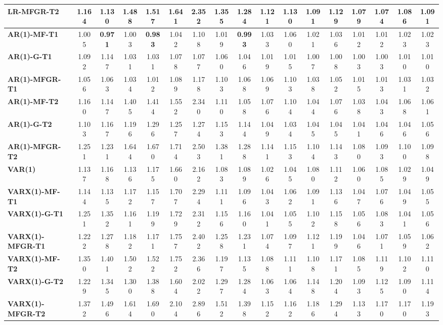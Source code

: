 \documentclass[Theme1]{{template_material/eurostat}}
\begin{document}
\begin{landscape}
\begin{table}[ht]
{\begin{tabular}{l|cc|cc|cc|cc|cc|cc|cc|cc}
\textbf{LR-MFGR-T2} & 1.164 & 1.130 & 1.488 & 1.517 & 1.641 & 2.352 & 1.355 & 1.284 & 1.121 & 1.130 & 1.091 & 1.129 & 1.079 & 1.074 & 1.086 & 1.091 \\
\hline
\textbf{AR(1)-MF-T1} & 1.005 & \textbf{0.971} & 1.003 & \textbf{0.983} & 1.042 & 1.108 & 1.019 & \textbf{0.993} & 1.033 & 1.060 & 1.021 & 1.036 & 1.012 & 1.012 & 1.023 & 1.023 \\
\textbf{AR(1)-G-T1} & 1.092 & 1.147 & 1.031 & 1.031 & 1.078 & 1.077 & 1.060 & 1.046 & 1.019 & 1.015 & 1.007 & 1.008 & 1.003 & 1.003 & 1.010 & 1.010 \\
\textbf{AR(1)-MFGR-T1} & 1.056 & 1.063 & 1.034 & 1.012 & 1.089 & 1.178 & 1.103 & 1.068 & 1.069 & 1.103 & 1.038 & 1.052 & 1.015 & 1.013 & 1.031 & 1.032 \\
\textbf{AR(1)-MF-T2} & 1.160 & 1.147 & 1.405 & 1.414 & 1.552 & 2.340 & 1.110 & 1.058 & 1.076 & 1.104 & 1.044 & 1.076 & 1.038 & 1.043 & 1.068 & 1.061 \\
\textbf{AR(1)-G-T2} & 1.103 & 1.167 & 1.196 & 1.296 & 1.257 & 1.274 & 1.153 & 1.144 & 1.049 & 1.034 & 1.045 & 1.045 & 1.041 & 1.046 & 1.046 & 1.056 \\
\textbf{AR(1)-MFGR-T2} & 1.251 & 1.231 & 1.644 & 1.670 & 1.714 & 2.503 & 1.381 & 1.288 & 1.141 & 1.153 & 1.104 & 1.143 & 1.080 & 1.093 & 1.100 & 1.098 \\
\hline
\textbf{VAR(1)} & 1.137 & 1.168 & 1.136 & 1.175 & 1.660 & 2.162 & 1.083 & 1.089 & 1.026 & 1.045 & 1.080 & 1.112 & 1.060 & 1.085 & 1.029 & 1.049 \\
\textbf{VARX(1)-MF-T1} & 1.144 & 1.135 & 1.172 & 1.157 & 1.707 & 2.294 & 1.111 & 1.096 & 1.043 & 1.062 & 1.091 & 1.136 & 1.047 & 1.076 & 1.049 & 1.055 \\
\textbf{VARX(1)-G-T1} & 1.251 & 1.352 & 1.161 & 1.199 & 1.729 & 2.312 & 1.156 & 1.160 & 1.041 & 1.055 & 1.102 & 1.158 & 1.056 & 1.083 & 1.041 & 1.056 \\
\textbf{VARX(1)-MFGR-T1} & 1.222 & 1.278 & 1.182 & 1.171 & 1.757 & 2.402 & 1.258 & 1.231 & 1.074 & 1.097 & 1.121 & 1.199 & 1.046 & 1.071 & 1.059 & 1.062 \\
\textbf{VARX(1)-MF-T2} & 1.350 & 1.401 & 1.502 & 1.522 & 1.752 & 2.366 & 1.197 & 1.135 & 1.088 & 1.111 & 1.108 & 1.171 & 1.085 & 1.119 & 1.102 & 1.110 \\
\textbf{VARX(1)-G-T2} & 1.229 & 1.345 & 1.300 & 1.388 & 1.604 & 2.022 & 1.297 & 1.284 & 1.063 & 1.064 & 1.148 & 1.204 & 1.093 & 1.125 & 1.090 & 1.114 \\
\textbf{VARX(1)-MFGR-T2} & 1.372 & 1.496 & 1.614 & 1.690 & 2.104 & 2.896 & 1.512 & 1.398 & 1.152 & 1.162 & 1.186 & 1.294 & 1.133 & 1.170 & 1.170 & 1.193 \\

\end{tabular}}
\end{table}
\end{landscape}
\end{document}
